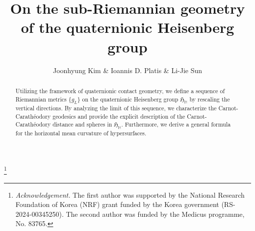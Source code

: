 \documentclass [12pt,a4paper]{amsart}
\newcommand{\frakH}{\mathfrak{H}}
\theoremstyle{plain}
\theoremstyle{definition}
\numberwithin{equation}{section}
\begin{document}
\title%
[sub-Riemannian geometry of the quaternionic Heisenberg group]
{On the sub-Riemannian geometry of the quaternionic Heisenberg group}
\author{Joonhyung Kim \& Ioannis D. Platis \& Li-Jie Sun}

\address{Department of Mathematics Education,
Chungnam National University,
 99 Daehak-ro, Yuseong-gu, Daejeon 34134,
 Korea.}

\address{Department of Mathematics,
University of Patras,
 Rion, Achaia, 26504,
 Greece.}
\address {Department of Applied Science, Yamaguchi University,
2-16-1 Tokiwadai, Ube 7558611,
Japan.
}

\thanks{{\it Acknowledgement.} The first author was supported by the National Research Foundation of Korea (NRF) grant funded by the Korea government (RS-2024-00345250). The second author was funded by the Medicus programme, No. 83765.}

%
\begin{abstract}

Utilizing the framework of quaternionic contact geometry, we define a sequence of Riemannian metrics $\{g_L\}$ on the quaternionic Heisenberg group $\frakH_{\mathbb{H}}$ by rescaling the vertical directions. By analyzing the limit of this sequence, we characterize the Carnot-Carath\'eodory geodesics and provide the explicit description of the Carnot-Carath\'eodory distance and spheres in $\frakH_{\mathbb{H}}$. Furthermore, we derive a general formula for the horizontal mean curvature of hypersurfaces. 

\end{abstract}
\maketitle
\end{document}
